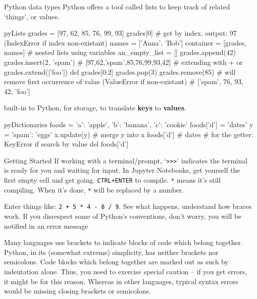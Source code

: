 \documentclass[10pt,a4paper]{article}
\begin{document}
\begin{multicols}{3}
\begin{textbox}{Python data types}
Python offers a tool called lists to keep track of related `things', or values.

\begin{codebox}{py}{Lists}
grades = [97, 62, 85, 76, 99, 93]
grades[0] # get by index. output: 97 (IndexError if index non-existant)
names = ['Anna', 'Bob']
container = [grades, names] # nested lists using variables
an_empty_list = []
grades.append(42)
grades.insert(2, 'spam') # [97,62,'spam',85,76,99,93,42]
# extending with + or 
grades.extend(['foo'])
del grades[0:2]
grades.pop(3)
grades.remove(85) # will remove first occurrence of value (ValueError if non-existant)
# ['spam', 76, 93, 42, 'foo']
\end{codebox}

 built-in to Python, for storage, to translate \textbf{keys} to \textbf{values}.

\begin{codebox}{py}{Dictionaries}
foods = {'a': 'apple', 'b': 'banana', 'c': 'cookie'}
foods['d'] = 'dates'
y = {'spam': 'eggs'}
x.update(y) # merge y into x
foods['d'] # dates 
# for the getter: KeyError if search by value
del foods['d']

\end{codebox}
\end{textbox}

\begin{textbox}{Getting Started}
If working with a terminal/prompt, `\verb|>>>|' indicates the terminal is ready for you and waiting for input. In Jupyter Notebooks, get yourself the first empty cell and get going. \texttt{CTRL+ENTER} to compile. \texttt{\lbrack{}*\rbrack{}} means it's still compiling. When it's done, \texttt{*} will be replaced by a number.

Enter things like: \texttt{2 + 5 * 4 - 8 / 9}.
See what happens, understand how braces work. If you disrespect some of Python's conventions, don't worry, you will be notified in an error message \faSmileO 

Many languages use brackets to indicate blocks of code which belong together. Python, in its (somewhat extreme) simplicity, has neither brackets nor semicolons.
Code blocks which belong together are marked out as such by indentation alone. Thus, you need to exercise special caution -- if you get errors, it might be for this reason. Whereas in other languages, typical syntax errors would be missing closing brackets or semicolons.
\end{textbox}


\end{multicols}
\end{document}
